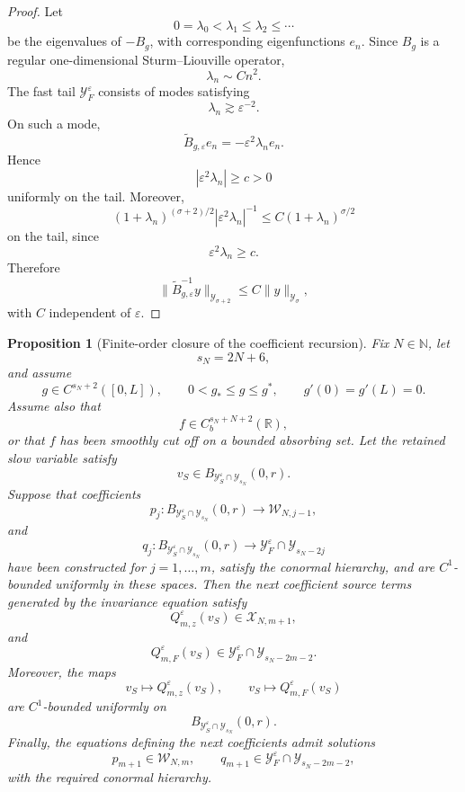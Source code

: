 \documentclass[11pt]{article}
\newtheorem{proposition}[theorem]{Proposition}
\theoremstyle{definition}
\theoremstyle{remark}
\numberwithin{equation}{section}
\begin{document}
\begin{proof}
Let
\[
0=\lambda_0<\lambda_1\le\lambda_2\le\cdots
\]
be the eigenvalues of \(-B_g\), with corresponding eigenfunctions \(e_n\).
Since \(B_g\) is a regular one-dimensional Sturm--Liouville operator,
\[
\lambda_n\sim Cn^2.
\]
The fast tail \(\mathcal Y_F^\varepsilon\) consists of modes satisfying
\[
\lambda_n\gtrsim \varepsilon^{-2}.
\]
On such a mode,
\[
\widetilde B_{g,\varepsilon}e_n
=
-\varepsilon^2\lambda_n e_n.
\]
Hence
\[
|\varepsilon^2\lambda_n|\ge c>0
\]
uniformly on the tail. Moreover,
\[
(1+\lambda_n)^{(\sigma+2)/2}
|\varepsilon^2\lambda_n|^{-1}
\le
C(1+\lambda_n)^{\sigma/2}
\]
on the tail, since
\[
\varepsilon^2\lambda_n\ge c.
\]
Therefore
\[
\|\widetilde B_{g,\varepsilon}^{-1}y\|_{\mathcal Y_{\sigma+2}}
\le
C\|y\|_{\mathcal Y_\sigma},
\]
with \(C\) independent of \(\varepsilon\).
\end{proof}

\begin{proposition}[Finite-order closure of the coefficient recursion]
\label{prop:finite-order-coefficient-closure}
Fix \(N\in\mathbb N\), let
\[
s_N=2N+6,
\]
and assume
\[
g\in C^{s_N+2}([0,L]),
\qquad
0<g_*\le g\le g^*,
\qquad
g'(0)=g'(L)=0.
\]
Assume also that
\[
f\in C_b^{s_N+N+2}(\mathbb R),
\]
or that \(f\) has been smoothly cut off on a bounded absorbing set. Let the
retained slow variable satisfy
\[
v_S\in
B_{\mathcal Y_S^\varepsilon\cap\mathcal Y_{s_N}}(0,r).
\]
Suppose that coefficients
\[
p_j:
B_{\mathcal Y_S^\varepsilon\cap\mathcal Y_{s_N}}(0,r)
\to
\mathcal W_{N,j-1},
\]
and
\[
q_j:
B_{\mathcal Y_S^\varepsilon\cap\mathcal Y_{s_N}}(0,r)
\to
\mathcal Y_F^\varepsilon\cap\mathcal Y_{s_N-2j}
\]
have been constructed for \(j=1,\dots,m\), satisfy the conormal hierarchy, and
are \(C^1\)-bounded uniformly in these spaces. Then the next coefficient source terms generated by the invariance equation satisfy
\[
Q_{m,z}^\varepsilon(v_S)\in \mathcal X_{N,m+1},
\]
and
\[
Q_{m,F}^\varepsilon(v_S)
\in
\mathcal Y_F^\varepsilon\cap\mathcal Y_{s_N-2m-2}.
\]
Moreover, the maps
\[
v_S\mapsto Q_{m,z}^\varepsilon(v_S),
\qquad
v_S\mapsto Q_{m,F}^\varepsilon(v_S)
\]
are \(C^1\)-bounded uniformly on
\[
B_{\mathcal Y_S^\varepsilon\cap\mathcal Y_{s_N}}(0,r).
\]
Finally, the equations defining the next coefficients admit solutions
\[
p_{m+1}\in\mathcal W_{N,m},
\qquad
q_{m+1}\in
\mathcal Y_F^\varepsilon\cap\mathcal Y_{s_N-2m-2},
\]
with the required conormal hierarchy.
\end{proposition}
\end{document}
